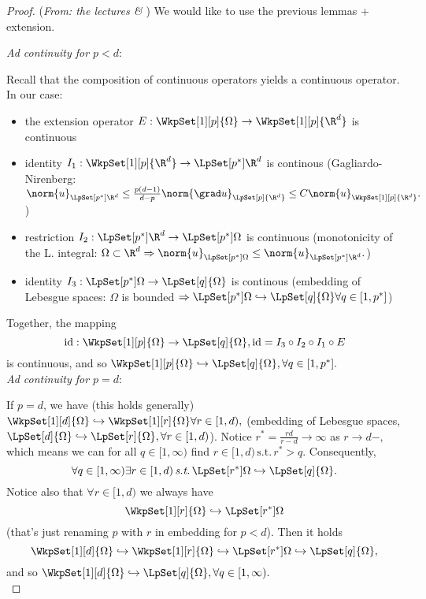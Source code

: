 \begin{proof}(\textit{From: the lectures \& \cite{bulicekUvodModerniTeorie2018}})
	We would like to use the previous lemmas + extension. 


	\textit{Ad continuity for $p<d$}:

	Recall that the composition of continuous operators yields a continuous operator. In our case:
	\begin{itemize}
		\item the extension operator $E:\WkpSet[1][p]{\Omega} \to \WkpSet[1][p]{\R^d}$ is continuous
		\item identity $I_1:\WkpSet[1][p]{\R^d}\to \LpSet[p^{*}]{\R^d}$ is continous (Gagliardo-Nirenberg: $\norm{u}_{\LpSet[p^{*}]{\R^{d}}}\leq \frac{p(d-1)}{d-p}\norm{\grad u}_{\LpSet[p]{\R^{d}}} \leq C \norm{u}_{\WkpSet[1][p]{\R^{d}}}.$)
		\item restriction $I_2: \LpSet[p^{*}]{\R^d}\to \LpSet[p^{*}]{\Omega}$ is continuous (monotonicity of the L. integral: $\Omega \subset \R^{d} \Rightarrow \norm{u}_{\LpSet[p^{*}]{\Omega}} \leq \norm{u}_{\LpSet[p^{*}]{\R^{d}}}.$)
		\item identity $I_3: \LpSet[p^{*}]{\Omega} \to \LpSet[q]{\Omega}$ is continous (embedding of Lebesgue spaces: $\Omega$ is bounded $\Rightarrow \LpSet[p^{*}]{\Omega} \hookrightarrow \LpSet[q]{\Omega} \forall q \in [1,p^{*}]$)
	\end{itemize}
	Together, the mapping
	\[
		\text{id}:\WkpSet[1][p]{\Omega} \to \LpSet[q]{\Omega}, \text{id}=I_3 \circ I_2 \circ I_1 \circ E
	\]
	is continuous, and so $\WkpSet[1][p]{\Omega} \hookrightarrow \LpSet[q]{\Omega}, \forall q \in [1, p^{*}].$\\


	\textit{Ad continuity for $p =d$}:

	If $p=d$, we have (this holds generally)  $\WkpSet[1][d]{\Omega} \hookrightarrow \WkpSet[1][r]{\Omega} \forall r \in [1,d),$ (embedding of Lebesgue spaces, $\LpSet[d]{\Omega}\hookrightarrow \LpSet[r]{\Omega}, \forall r \in [1,d)$). Notice $r^{*} = \frac{r d}{r-d} \to \infty$ as $r\to d-,$ which means we can for all $q \in [1,\infty)$ find $r \in [1,d) \, \text{s.t.} \, r^{*} >q.$ Consequently,
	\[
		\forall q \in [1,\infty) \exists r \in [1,d) \, \text{\textit{s.t.}} \, \LpSet[r^{*}]{\Omega} \hookrightarrow \LpSet[q]{\Omega}.
	\]
	Notice also that $\forall r \in [1,d)$ we always have
	\[
		\WkpSet[1][r]{\Omega} \hookrightarrow \LpSet[r^{*}]{\Omega}
	\]
	(that's just renaming $p$ with $r$ in embedding for $p<d$). Then it holds
	\[
		\WkpSet[1][d]{\Omega} \hookrightarrow \WkpSet[1][r]{\Omega} \hookrightarrow \LpSet[r^{*}]{\Omega} \hookrightarrow \LpSet[q]{\Omega},
	\]
	and so $\WkpSet[1][d]{\Omega} \hookrightarrow \LpSet[q]{\Omega}, \forall q \in [1,\infty).$\\


\end{proof}
